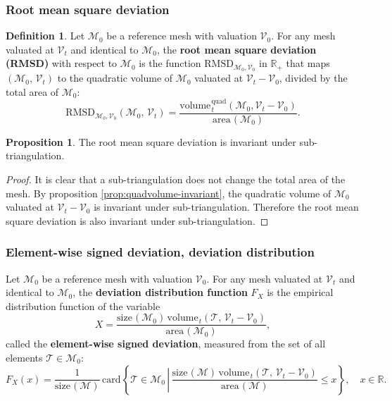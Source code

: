 \documentclass{article}
\theoremstyle{definition}
\newtheorem{defn}{Definition}
\newtheorem{prop}{Proposition}
\newcommand{\RR}{\mathbb{R}}
\newcommand{\MM}{\mathcal{M}}
\newcommand{\VV}{\mathcal{V}}
\newcommand{\TT}{\mathcal{T}}
\newcommand{\area}{\mathrm{area}\hspace{1pt}}
\newcommand{\size}{\mathrm{size}\hspace{1pt}}
\newcommand{\vol}{\mathrm{volume\hspace{1pt}}}
\newcommand{\card}{\mathrm{card\hspace{1pt}}}
\newcommand{\quadvol}{\mathrm{volume\hspace{1pt}}^\mathrm{quad}}
\begin{document}
\subsubsection{Root mean square deviation}
\begin{defn}
Let $\MM_0$ be a reference mesh with valuation $\VV_0$. For any mesh valuated at $\VV_t$ and identical to $\MM_0$, the \textbf{root mean square deviation (RMSD)} with respect to $\MM_0$ is the function  $\mathrm{RMSD}_{\MM_0,\VV_0}$ in $\RR_+$ that maps $(\MM_0,\,\VV_t)$ to the quadratic volume of $\MM_0$ valuated at $\VV_t-\VV_0$, divided by the total area of $\MM_0$:
\[\mathrm{RMSD}_{\MM_0,\VV_0} (\MM_0,\,\VV_t) = \frac{\quadvol_t(\MM_0, \VV_t-\VV_0)}{\area(\MM_0)}.\]
\end{defn}

\begin{prop}
The root mean square deviation is invariant under sub-triangulation.
\end{prop}
\begin{proof}[Proof]
It is clear that a sub-triangulation does not change the total area of the mesh.
By proposition \ref{prop:quadvolume-invariant}, the quadratic volume of $\MM_0$ valuated at $\VV_t-\VV_0$ is invariant under sub-triangulation. Therefore the root mean square deviation is also invariant under sub-triangulation.
\end{proof}




\subsubsection{Element-wise signed deviation, deviation distribution}
Let $\MM_0$ be a reference mesh with valuation $\VV_0$. For any mesh valuated at $\VV_t$ and identical to $\MM_0$, the \textbf{deviation distribution function} $F_X$ is the empirical distribution function of the variable
\[X = \frac{\size(\MM_0)\,\vol_t(\TT,\,\VV_t-\VV_0)}{\area(\MM_0)},\]
called the \textbf{element-wise signed deviation}, measured from the set of all elements $\TT\in\MM_0$:
\[F_X(x) = \frac{1}{\size(\MM)}\, \card \left\{   \TT\in\MM_0 \,\left|\,
\frac{\size(\MM)\,\vol_t(\TT,\,\VV_t-\VV_0)}{\area(\MM)}\right. \leqslant x \right\},
\quad x\in\RR.\]
\end{document}
